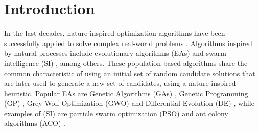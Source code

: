 \documentclass[review]{elsarticle}
\begin{document}
\linenumbers

\section{Introduction}

In the last decades, nature-inspired optimization algorithms have been successfully
applied to solve complex real-world problems \cite{yang2014nature}. Algorithms
inspired by natural processes include evolutionary algorithms (EAs)
\cite{back1996evolutionary} and swarm intelligence (SI) \cite{kennedy2006swarm},
among others. These population-based algorithms share the common characteristic
of using an initial set of random candidate solutions that are later used to
generate a new set of candidates, using a nature-inspired heuristic. Popular EAs
are Genetic Algorithms (GAs) \cite{holland1992adaptation,eiben2003genetic}, 
Genetic Programming (GP) \cite{back1996evolutionary}, Grey Wolf Optimization
(GWO) \cite{mirjalili2014grey} and Differential Evolution (DE) \cite{karabouga2004simple},
while examples of (SI) \cite{kennedy2006swarm} are particle swarm
optimization (PSO) \cite{clerc2010particle} and ant colony algorithms (ACO) \cite{dorigo1999ant}.
\end{document}
